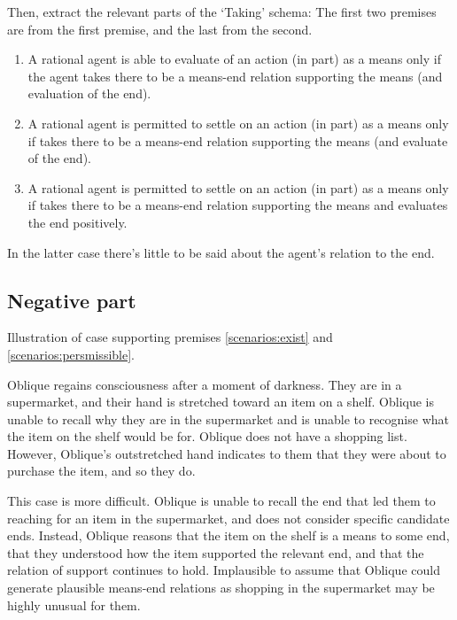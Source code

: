 \documentclass[10pt]{article}
\newcommand{\hozlinedash}[0]{%
  \noindent\hdashrule[0.5ex][c]{\textwidth}{.1pt}{2.5pt}
}
\begin{document}
Then, extract the relevant parts of the `Taking' schema:
The first two premises are from the first premise, and the last from the second.

\begin{enumerate}
\item A rational agent is able to evaluate of an action (in part) as a means only if the agent takes there to be a means-end relation supporting the means (and evaluation of the end).
\item A rational agent is permitted to settle on an action (in part) as a means only if takes there to be a means-end relation supporting the means (and evaluate of the end).
\item A rational agent is permitted to settle on an action (in part) as a means only if takes there to be a means-end relation supporting the means and evaluates the end positively.
\end{enumerate}

\hozlinedash


In the latter case there's little to be said about the agent's relation to the end.


\newpage


\subsection{Negative part}
\label{sec:negative-part}


Illustration of case supporting premises \ref{scenarios:exist} and \ref{scenarios:persmissible}.

\hozlinedash

\begin{scenario}[Supermarket]
  Oblique regains consciousness after a moment of darkness.
  They are in a supermarket, and their hand is stretched toward an item on a shelf.
  Oblique is unable to recall why they are in the supermarket and is unable to recognise what the item on the shelf would be for.
  Oblique does not have a shopping list.
  However, Oblique's outstretched hand indicates to them that they were about to purchase the item, and so they do.
\end{scenario}

This case is more difficult.
Oblique is unable to recall the end that led them to reaching for an item in the supermarket, and does not consider specific candidate ends.
Instead, Oblique reasons that the item on the shelf is a means to some end, that they understood how the item supported the relevant end, and that the relation of support continues to hold.
Implausible to assume that Oblique could generate plausible means-end relations as shopping in the supermarket may be highly unusual for them.
\end{document}
